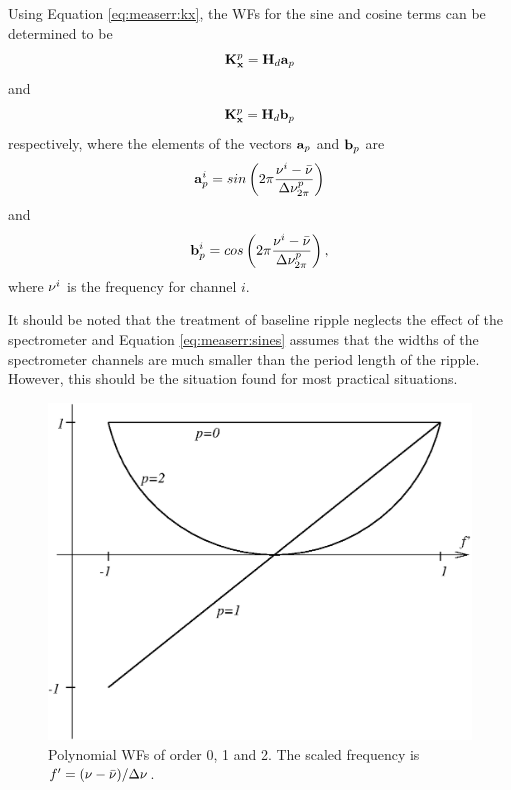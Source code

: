  Using Equation \ref{eq:measerr:kx}, the
 WFs for the sine and cosine terms can be determined to be
 \begin{equation}
   \mathbf{K}_{\mathbf{x}}^p = \mathbf{H}_d \mathbf{a}_p
 \end{equation}
 and
 \begin{equation}
   \mathbf{K}_{\mathbf{x}}^p = \mathbf{H}_d \mathbf{b}_p
 \end{equation}
 respectively, where the elements of the vectors $\mathbf{a}_p$ and
 $\mathbf{b}_p$ are
 \begin{equation}
   \mathbf{a}_p^i = sin\left(2\pi\frac{\nu^i-\bar{\nu}}{\Delta \nu_{2\pi}^p}\right) 
 \end{equation}
 and
 \begin{equation}
   \mathbf{b}_p^i = cos\left(2\pi\frac{\nu^i-\bar{\nu}}{\Delta \nu_{2\pi}^p}\right),
 \end{equation}
 where $\nu^i$ is the frequency for channel $i$.
 
 It should be noted that the treatment of baseline ripple neglects the
 effect of the spectrometer and Equation \ref{eq:measerr:sines} assumes
 that the widths of the spectrometer channels are much smaller than
 the period length of the ripple. However, this should be the
 situation found for most practical situations.



 \label{sec:measerr:pol}
 
 \begin{figure}
  \begin{center}
   \begin{minipage}[c]{0.65\textwidth}
    \centering
    \includegraphics*[width=0.99\hsize]{Figs/kpol.eps}
   \end{minipage}%
   \hspace{0.03\textwidth}%
   \begin{minipage}[c]{0.30\textwidth}
    \centering
    \caption{Polynomial WFs of order 0, 1 and 2. The scaled frequency is
             \mbox{$f'=(\nu-\bar{\nu})/\Delta \nu$.}}
    \label{fig:measerr:kpol}
   \end{minipage}
  \end{center}
 \end{figure}           

